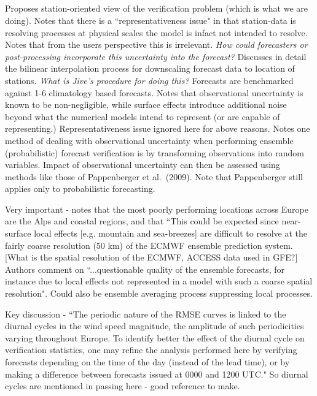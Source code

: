 \documentclass{article}
\begin{document}
\subsection{\citet{pinson12}}
Proposes station-oriented view of the verification problem (which is what we are doing). Notes that there is a ``representativeness issue" in that station-data is resolving processes at physical scales the model is infact not intended to resolve. Notes that from the users perspective this is irrelevant. \textit{How could forecasters or post-processing incorporate this uncertainty into the forecast?} Discusses in detail the bilinear interpolation process for downscaling forecast data to location of stations. \textit{What is Jive's procedure for doing this?} Forecasts are benchmarked against 1-6 climatology based forecasts. Notes that observational uncertainty is known to be non-negligible, while surface effects introduce additional noise beyond what the numerical models intend to represent (or are capable of representing.) Representativeness issue ignored here for above reasons. Notes one method of dealing with observational uncertainty when performing ensemble (probabilistic) forecast verification is by transforming observations into random variables. Impact of observational uncertainty can then be assessed using methods like those of Pappenberger et al.~(2009). Note that Pappenberger still applies only to probabilistic forecasting. 

Very important - notes that the most poorly performing locations across Europe are the Alps and coastal regions, and that ``This could be expected since near-surface local effects [e.g. mountain and sea-breezes] are difficult to resolve at the fairly coarse resolution (50 km) of the ECMWF ensemble prediction system. [What is the spatial resolution of the ECMWF, ACCESS data used in GFE?] Authors comment on ``...questionable quality of the ensemble forecasts, for instance due to local effects not represented in a model with such a coarse spatial resolution". Could also be ensemble averaging process suppressing local processes.    

Key discussion - ``The periodic nature of the RMSE curves is linked to the diurnal cycles in the wind speed magnitude, the amplitude of such periodicities varying throughout Europe. To identify better the effect of the diurnal cycle on verification statistics, one may refine the analysis performed here by verifying forecasts depending on the time of the day (instead of the lead time), or by making a difference between forecasts issued at 0000 and 1200 UTC." So diurnal cycles are mentioned in passing here - good reference to make.  
\end{document}
